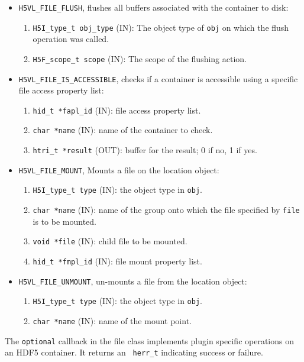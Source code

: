 \begin{itemize}
\item {\tt H5VL\_FILE\_FLUSH}, flushes all buffers associated with the container to disk:
  \begin{enumerate}
  \item {\tt H5I\_type\_t obj\_type} (IN): The object type of {\tt obj} on which the flush operation was called.
  \item {\tt H5F\_scope\_t scope} (IN): The scope of the flushing action.
  \end{enumerate}
  
\item {\tt H5VL\_FILE\_IS\_ACCESSIBLE}, checks if a container is
  accessible using a specific file access property list:
  \begin{enumerate}
  \item {\tt hid\_t *fapl\_id} (IN): file access property list.
  \item {\tt char *name} (IN): name of the container to check.
  \item {\tt htri\_t *result} (OUT): buffer for the result; 0 if no, 1
    if yes.
  \end{enumerate}
  
\item {\tt H5VL\_FILE\_MOUNT}, Mounts a file on the location object:
  \begin{enumerate}
  \item {\tt H5I\_type\_t type} (IN): the object type in {\tt obj}.
  \item {\tt char *name} (IN): name of the group onto which the file
    specified by {\tt file} is to be mounted.
  \item {\tt void *file} (IN): child file to be mounted.
  \item {\tt hid\_t *fmpl\_id} (IN): file mount property list.
  \end{enumerate}

\item {\tt H5VL\_FILE\_UNMOUNT}, un-mounts a file from the location object:
  \begin{enumerate}
  \item {\tt H5I\_type\_t type} (IN): the object type in {\tt obj}.
  \item {\tt char *name} (IN): name of the mount point.
  \end{enumerate}
\end{itemize}

The {\tt optional} callback in the file class implements plugin specific operations on an HDF5 container. It returns an {\tt
  herr\_t} indicating success or failure. 

